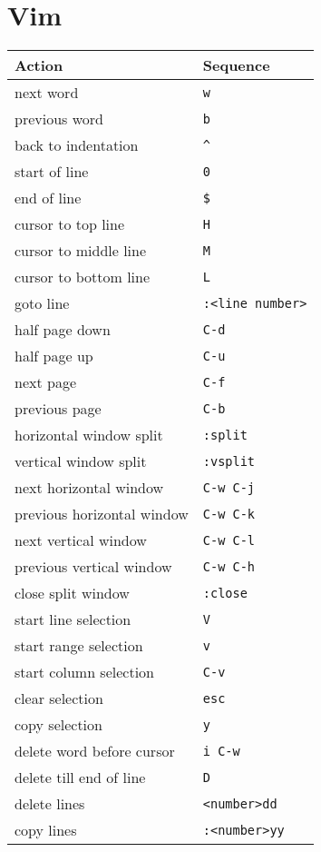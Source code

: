 \documentclass[report,twocolumn]{IEEEtran}
\begin{document}
\section{Vim}
\begin{center}
\begin{tabular}{ l | l }
\hline
Action & Sequence\\
\hline
next word & \texttt{w} \\
previous word & \texttt{b} \\
back to indentation & \texttt{\^} \\
start of line & \texttt{0} \\
end of line & \texttt{\$} \\
cursor to top line & \texttt{H} \\
cursor to middle line & \texttt{M} \\
cursor to bottom line & \texttt{L} \\
goto line & \texttt{:<line number>} \\
half page down & \texttt{C-d} \\
half page up & \texttt{C-u} \\
next page & \texttt{C-f} \\
previous page & \texttt{C-b} \\
horizontal window split & \texttt{:split} \\
vertical window split & \texttt{:vsplit} \\
next horizontal window & \texttt{C-w C-j} \\
previous horizontal window & \texttt{C-w C-k} \\
next vertical window & \texttt{C-w C-l} \\
previous vertical window & \texttt{C-w C-h} \\
close split window & \texttt{:close} \\
\hline
start line selection & \texttt{V} \\
start range selection & \texttt{v} \\
start column selection & \texttt{C-v} \\
clear selection & \texttt{esc} \\
copy selection & \texttt{y} \\
\hline
delete word before cursor & \texttt{i C-w} \\
delete till end of line & \texttt{D} \\
delete lines & \texttt{<number>dd} \\
copy lines & \texttt{:<number>yy} \\

\end{tabular}
\end{center}
\end{document}
